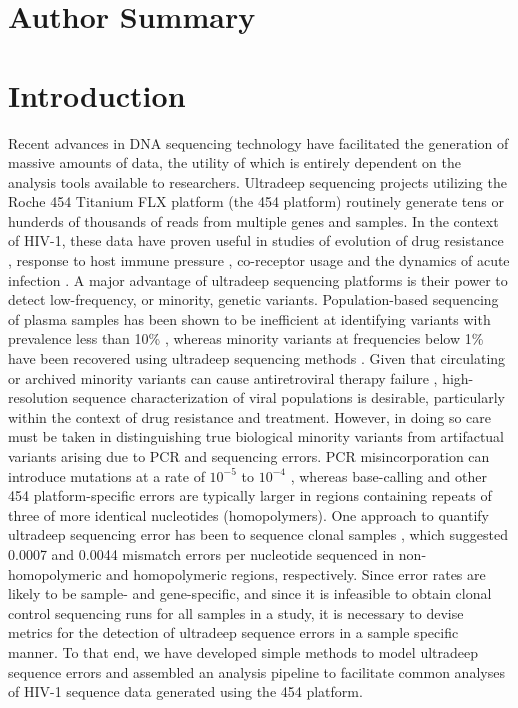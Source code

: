 \documentclass[10pt]{article}
\begin{document}
\section*{Author Summary}

\section*{Introduction}
Recent advances in DNA sequencing technology have facilitated the generation of massive amounts of data,
the utility of which is entirely dependent on the analysis tools available to researchers.
Ultradeep sequencing projects utilizing the Roche 454 Titanium FLX platform (the 454 platform)
routinely generate tens or hunderds of thousands of reads from multiple genes and samples.
In the context of HIV-1,
these data have proven useful in studies of evolution of drug resistance \cite{Wang2007,Hoffmann2007},
response to host immune pressure \cite{Bimber2009,Hughes2010,Poon2010,Love2010},
co-receptor usage \cite{Archer2009,Tsibris2009} and the dynamics of acute infection \cite{Fischer2010}.
A major advantage of ultradeep sequencing platforms is their power to detect low-frequency, or minority, genetic variants.
Population-based sequencing of plasma samples has been shown to be inefficient at identifying variants with prevalence less than 10\% \cite{Palmer2005},
whereas minority variants at frequencies below 1\% have been recovered using ultradeep sequencing methods \cite{Zagordi2010}.
Given that circulating or archived minority variants can cause antiretroviral therapy failure \cite{Palmer2006,Lecossier2005,Kapoor2004},
high-resolution sequence characterization of viral populations is desirable,
particularly within the context of drug resistance and treatment.
However, in doing so care must be taken in distinguishing true biological minority variants from artifactual variants arising due to PCR and sequencing errors.
PCR misincorporation can introduce mutations at a rate of $10^{-5}$ to $10^{-4}$ \cite{Kobayashi1999},
whereas base-calling and other 454 platform-specific errors are typically larger
in regions containing repeats of three of more identical nucleotides (homopolymers)\cite{Wang2007}.
One approach to quantify ultradeep sequencing error has been to sequence clonal samples \cite{Wang2007},
which suggested 0.0007 and 0.0044 mismatch errors per nucleotide sequenced in non-homopolymeric and homopolymeric regions, respectively.
Since error rates are likely to be sample- and gene-specific,
and since it is infeasible to obtain clonal control sequencing runs for all samples in a study,
it is necessary to devise metrics for the detection of ultradeep sequence errors in a sample specific manner.
To that end, we have developed simple methods to model ultradeep sequence errors
and assembled an analysis pipeline to facilitate common analyses of HIV-1 sequence data generated using the 454 platform.
\end{document}
